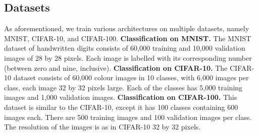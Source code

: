 \subsection{Datasets}
As aforementioned, we train various architectures on multiple datasets, namely MNIST, CIFAR-10, and CIFAR-100. 
\newline
\textbf{Classification on MNIST.}
The MNIST dataset of handwritten digits consists of 60,000 training and 10,000 validation images of 28 by 28 pixels. Each image is labelled with its corresponding number (between zero and nine, inclusive).
\newline
\textbf{Classification on CIFAR-10.}
The CIFAR-10 dataset consists of 60,000 colour images in 10 classes, with 6,000 images per class, each image 32 by 32 pixels large. Each of the classes has 5,000 training images and 1,000 validation images. 
\newline
\textbf{Classification on CIFAR-100.}
This dataset is similar to the CIFAR-10, except it has 100 classes containing 600 images each. There are 500 training images and 100 validation images per class. The resolution of the images is as in CIFAR-10 32 by 32 pixels.

